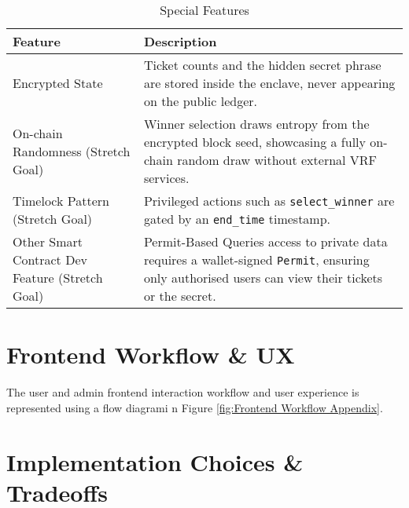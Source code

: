 \documentclass{article}
\begin{document}
\begin{table}[h]
  \centering
  \caption{Special Features}
  \begin{tabular}{@{}lp{10cm}@{}}
    \toprule
    \textbf{Feature} & \textbf{Description} \\
    \midrule
    Encrypted State & Ticket counts and the hidden secret phrase are stored inside the enclave, never appearing on the public ledger. \\
    \midrule
    On-chain Randomness (Stretch Goal) & Winner selection draws entropy from the encrypted block seed, showcasing a fully on-chain random draw without external VRF services. \\
    \midrule
    Timelock Pattern (Stretch Goal) & Privileged actions such as \texttt{select\_winner} are gated by an \texttt{end\_time} timestamp. \\
    \midrule
    Other Smart Contract Dev Feature (Stretch Goal) & Permit-Based Queries access to private data requires a wallet-signed \texttt{Permit}, ensuring only authorised users can view their tickets or the secret. \\
    \bottomrule
  \end{tabular}
\end{table}

\section{Frontend Workflow \& UX}
The user and admin frontend interaction workflow and user experience is represented using a flow diagrami n Figure \ref{fig:Frontend Workflow Appendix}.

\section{Implementation Choices \& Tradeoffs}
\end{document}
